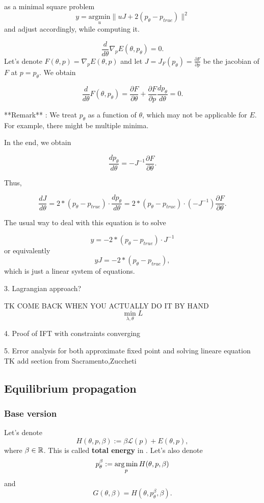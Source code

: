 \documentclass[a4paper,10pt]{report}
\begin{document}
as a minimal square problem
$$y = \underset{u}{\mathrm{argmin }}\|uJ + 2(p_\theta-p_{true})\|^2$$ and adjust accordingly, while computing it.


$$ \frac{d}{d\theta} \nabla_p E(\theta,p_\theta) = 0.$$
 Let's denote $F(\theta,p) = \nabla_p E(\theta,p)$ and let $J = J_{F}(p_\theta)=\frac{\partial F}{\partial p}$ be the jacobian of $F$ at $p = p_\theta$.
We obtain

$$\frac{d}{d\theta}F(\theta,p_\theta) = \frac{\partial F}{\partial \theta} + \frac{\partial F}{\partial p}\frac{d p_\theta}{d\theta}= 0 .$$

**Remark** : We treat $p_\theta$ as a function of $\theta$, which may not be applicable for $E$.
For example, there might be multiple minima.

In the end, we obtain

$$ \frac{d p_\theta}{d\theta} = - J^{-1} \frac{\partial F}{\partial \theta}.$$

Thus,

$$\frac{d J}{d\theta} = 2*(p_\theta-p_{true})\cdot \frac{d p_\theta}{d\theta} = 2*(p_\theta-p_{true})\cdot (-J^{-1}) \frac{\partial F}{\partial \theta}.$$

The usual way to deal with this equation is to solve

$$y =- 2*(p_\theta-p_{true}) \cdot J^{-1}$$
or equivalently
$$ yJ = -2*(p_\theta - p_{true}),$$ which is just a linear system of equations.

3. Lagrangian approach?

TK COME BACK WHEN YOU ACTUALLY DO IT BY HAND
 \begin{equation}
\min_{\lambda,\theta} L
 \end{equation}

4. Proof of IFT with constraints converging

5. Error analysis for both approximate fixed point and solving lineare equation
TK add section from Sacramento,Zuccheti
\subsection{ Equilibrium propagation}

\subsubsection{Base version}

Let's denote
\begin{equation}
H(\theta, p, \beta) := \beta \mathcal{L}(p) + E(\theta, p),
\end{equation}
where $\beta \in \mathbb{R}$.
 This is called \textbf{total energy} in \cite{eqprop}. Let's also denote
\begin{equation}
p_{\theta}^{\beta}:=\operatorname*{arg\,min}_p H(\theta, p, \beta)
\end{equation}
and
\begin{equation}
 G(\theta, \beta) = H(\theta, p_\theta^\beta, \beta).
\end{equation}
\end{document}

